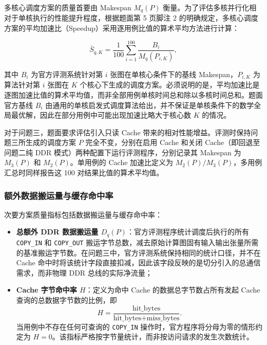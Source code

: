 \documentclass[anonymous,notoc]{gmcm2026}
\providecommand{\tightlist}{\setlength{\itemsep}{0pt}\setlength{\parskip}{0pt}}
\begin{document}
多核心调度方案的质量首要由 Makespan \(M_q(P)\) 衡量。为了评估多核并行化相对于单核执行的性能提升程度，根据题面第 5 页脚注 2 的明确规定，多核心调度方案的平均加速比（Speedup）采用逐用例比值的算术平均方法进行计算：

\begin{equation}
\bar{S}_{q,K} = \frac{1}{100} \sum_{i=1}^{100} \frac{B_i}{M_q(P_{i,K})},
\end{equation}

其中 \(B_i\) 为官方评测系统针对第 \(i\) 张图在单核心条件下的基线 Makespan，\(P_{i,K}\) 为算法针对第 \(i\) 张图在 \(K\) 个核心下生成的调度方案。必须说明的是，平均加速比是逐图加速比值的算术平均值，而非全部用例单核时间总和除以多核时间总和。题面官方基线 \(B_i\) 由通用的单核启发式调度算法给出，并不保证是单核条件下的数学全局最优解，因此在部分用例中可能出现加速比略大于核心数 \(K\) 的情况。

对于问题三，题面要求评估引入只读 Cache 带来的相对性能增益。评测时保持问题三所生成的调度方案 \(P\) 完全不变，分别在启用 Cache 和关闭 Cache（即回退至问题二纯 DDR 模式）两种配置下运行评测程序，分别记录其 Makespan 为 \(M_3(P)\) 和 \(M_2(P)\)。单用例的 Cache 加速比定义为 \(M_2(P) / M_3(P)\)，多用例汇总时同样报告这 100 对结果比值的算术平均值。

\subsubsection{额外数据搬运量与缓存命中率}

次要方案质量指标包括数据搬运量与缓存命中率：

\begin{itemize}
\tightlist
\item
  \textbf{总额外 DDR 数据搬运量 \(D_q(P)\)}：官方评测程序统计调度后执行的所有 \texttt{COPY\_IN} 和 \texttt{COPY\_OUT} 搬运字节总数，减去原始计算图固有输入输出张量所需的基准搬运字节数。在问题三中，官方评测系统保持相同的统计口径，并不在 Cache 命中时将该统计字段直接扣减，因此该字段反映的是切分引入的总通信需求，而非物理 DDR 总线的实际净流量；
\item
  \textbf{Cache 字节命中率 \(H\)}：定义为命中 Cache 的数据总字节数占所有发起 Cache 查询的总数据字节数的比例，即 \begin{equation}
H = \frac{\text{hit\_bytes}}{\text{hit\_bytes} + \text{miss\_bytes}}.
\end{equation} 当用例中不存在任何可查询的 \texttt{COPY\_IN} 操作时，官方程序将分母为零的情形约定为 \(H = 0\)。该指标严格按字节量统计，而非按访问请求的发生次数统计。
\end{itemize}
\end{document}
